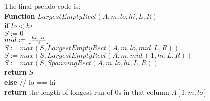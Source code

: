 \documentclass[11pt]{article}
\DeclarePairedDelimiter\floor{\lfloor}{\rfloor}
\begin{document}
The final pseudo code is:\\

\textbf{Function} $LargestEmptyRect(A,m,lo,hi,L,R)$\\
\-\hspace{2em} \textbf{if} $lo < hi$ \\
\-\hspace{4em} $S := 0$\\
\-\hspace{4em} $mid := \floor{\frac{hi+lo}{2}}$\\
\-\hspace{4em} $S := max(S, LargestEmptyRect(A,m,lo,mid,L,R))$\\
\-\hspace{4em} $S := max(S, LargestEmptyRect(A,m,mid+1,hi,L,R))$\\
\-\hspace{4em} $S := max(S, SpanningRect(A,m,lo,hi,L,R))$\\
\-\hspace{4em} \textbf{return} $S$\\
\-\hspace{2em} \textbf{else} // lo == hi\\
\-\hspace{4em} \textbf{return} the length of longest run of 0s in that
column $A[1:m, lo]$\\
\end{document}
